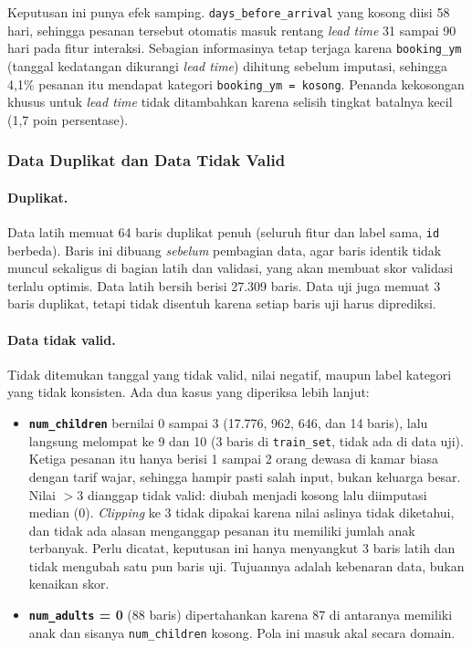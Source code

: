 Keputusan ini punya efek samping. \texttt{days\_before\_arrival} yang kosong diisi 58 hari, sehingga pesanan tersebut otomatis masuk rentang \textit{lead time} 31 sampai 90 hari pada fitur interaksi. Sebagian informasinya tetap terjaga karena \texttt{booking\_ym} (tanggal kedatangan dikurangi \textit{lead time}) dihitung sebelum imputasi, sehingga 4,1\% pesanan itu mendapat kategori \texttt{booking\_ym = kosong}. Penanda kekosongan khusus untuk \textit{lead time} tidak ditambahkan karena selisih tingkat batalnya kecil (1,7 poin persentase).

\subsubsection{Data Duplikat dan Data Tidak Valid}
\paragraph{Duplikat.} Data latih memuat 64 baris duplikat penuh (seluruh fitur dan label sama, \texttt{id} berbeda). Baris ini dibuang \emph{sebelum} pembagian data, agar baris identik tidak muncul sekaligus di bagian latih dan validasi, yang akan membuat skor validasi terlalu optimis. Data latih bersih berisi 27.309 baris. Data uji juga memuat 3 baris duplikat, tetapi tidak disentuh karena setiap baris uji harus diprediksi.

\paragraph{Data tidak valid.} Tidak ditemukan tanggal yang tidak valid, nilai negatif, maupun label kategori yang tidak konsisten. Ada dua kasus yang diperiksa lebih lanjut:
\begin{itemize}
	\item \textbf{\texttt{num\_children}} bernilai 0 sampai 3 (17.776, 962, 646, dan 14 baris), lalu langsung melompat ke 9 dan 10 (3 baris di \texttt{train\_set}, tidak ada di data uji). Ketiga pesanan itu hanya berisi 1 sampai 2 orang dewasa di kamar biasa dengan tarif wajar, sehingga hampir pasti salah input, bukan keluarga besar. Nilai $> 3$ dianggap tidak valid: diubah menjadi kosong lalu diimputasi median (0). \textit{Clipping} ke 3 tidak dipakai karena nilai aslinya tidak diketahui, dan tidak ada alasan menganggap pesanan itu memiliki jumlah anak terbanyak. Perlu dicatat, keputusan ini hanya menyangkut 3 baris latih dan tidak mengubah satu pun baris uji. Tujuannya adalah kebenaran data, bukan kenaikan skor.
	\item \textbf{\texttt{num\_adults} = 0} (88 baris) dipertahankan karena 87 di antaranya memiliki anak dan sisanya \texttt{num\_children} kosong. Pola ini masuk akal secara domain.
\end{itemize}

